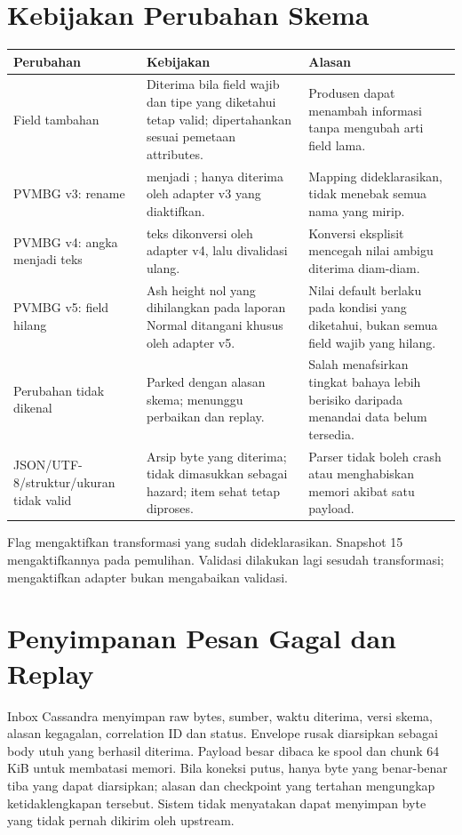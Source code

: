 \section{Kebijakan Perubahan Skema}
\begin{longtable}{@{}P{3.6cm}P{5.8cm}P{6.1cm}@{}}
\toprule Perubahan & Kebijakan & Alasan\\\midrule\endhead
Field tambahan & Diterima bila field wajib dan tipe yang diketahui tetap valid; dipertahankan sesuai pemetaan attributes. & Produsen dapat menambah informasi tanpa mengubah arti field lama.\\
PVMBG v3: rename &  menjadi ; hanya diterima oleh adapter v3 yang diaktifkan. & Mapping dideklarasikan, tidak menebak semua nama yang mirip.\\
PVMBG v4: angka menjadi teks &  teks dikonversi oleh adapter v4, lalu divalidasi ulang. & Konversi eksplisit mencegah nilai ambigu diterima diam-diam.\\
PVMBG v5: field hilang & Ash height nol yang dihilangkan pada laporan Normal ditangani khusus oleh adapter v5. & Nilai default berlaku pada kondisi yang diketahui, bukan semua field wajib yang hilang.\\
Perubahan tidak dikenal & Parked dengan alasan skema; menunggu perbaikan dan replay. & Salah menafsirkan tingkat bahaya lebih berisiko daripada menandai data belum tersedia.\\
JSON/UTF-8/struktur/ukuran tidak valid & Arsip byte yang diterima; tidak dimasukkan sebagai hazard; item sehat tetap diproses. & Parser tidak boleh crash atau menghabiskan memori akibat satu payload.\\\bottomrule
\end{longtable}
Flag  mengaktifkan transformasi yang sudah dideklarasikan. Snapshot 15 mengaktifkannya pada pemulihan. Validasi dilakukan lagi sesudah transformasi; mengaktifkan adapter bukan mengabaikan validasi.

\section{Penyimpanan Pesan Gagal dan Replay}
Inbox Cassandra menyimpan raw bytes, sumber, waktu diterima, versi skema, alasan kegagalan, correlation ID dan status. Envelope rusak diarsipkan sebagai body utuh yang berhasil diterima. Payload besar dibaca ke spool dan chunk 64 KiB untuk membatasi memori. Bila koneksi putus, hanya byte yang benar-benar tiba yang dapat diarsipkan; alasan  dan checkpoint yang tertahan mengungkap ketidaklengkapan tersebut. Sistem tidak menyatakan dapat menyimpan byte yang tidak pernah dikirim oleh upstream.

